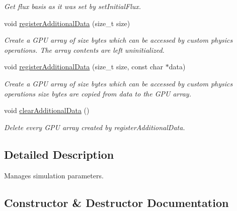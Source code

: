 \begin{DoxyCompactItemize}
\begin{DoxyCompactList}\small\item\em Get flux basis as it was set by set\+Initial\+Flux. \end{DoxyCompactList}\item 
void \hyperlink{structcudanusquids_1_1ParameterObject_a1c4d9b3219f1a6e563a7c79920148369}{register\+Additional\+Data} (size\+\_\+t size)
\begin{DoxyCompactList}\small\item\em Create a G\+PU array of size bytes which can be accessed by custom physics operations. The array contents are left uninitialized. \end{DoxyCompactList}\item 
void \hyperlink{structcudanusquids_1_1ParameterObject_adbda5c690a7283179528fc0609459f90}{register\+Additional\+Data} (size\+\_\+t size, const char $\ast$data)
\begin{DoxyCompactList}\small\item\em Create a G\+PU array of size bytes which can be accessed by custom physics operations size bytes are copied from data to the G\+PU array. \end{DoxyCompactList}\item 
void \hyperlink{structcudanusquids_1_1ParameterObject_a70bad51407513e04ad2f542418be5915}{clear\+Additional\+Data} ()\hypertarget{structcudanusquids_1_1ParameterObject_a70bad51407513e04ad2f542418be5915}{}\label{structcudanusquids_1_1ParameterObject_a70bad51407513e04ad2f542418be5915}

\begin{DoxyCompactList}\small\item\em Delete every G\+PU array created by register\+Additional\+Data. \end{DoxyCompactList}\end{DoxyCompactItemize}


\subsection{Detailed Description}
Manages simulation parameters. 

\subsection{Constructor \& Destructor Documentation}
